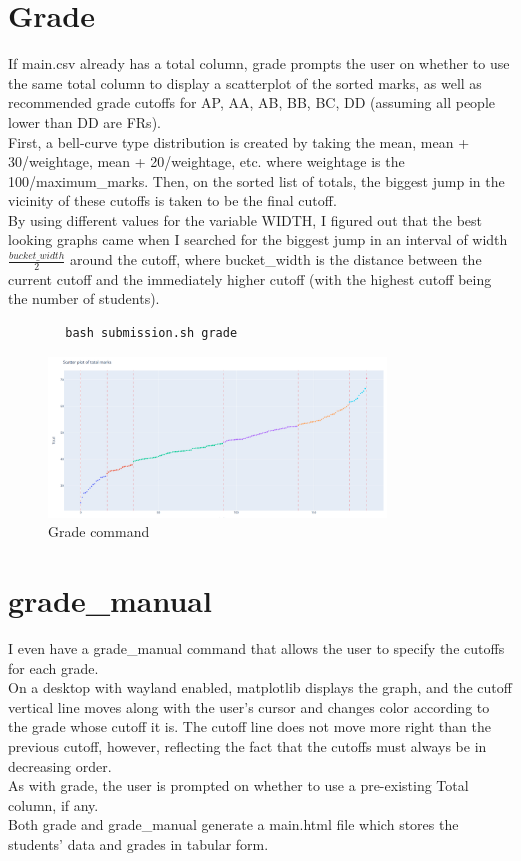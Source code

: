 \documentclass{article}
\begin{document}
    \section{Grade}
    If main.csv already has a total column, grade prompts the user on whether to use the same total column to display a scatterplot of the sorted marks, as well as recommended grade cutoffs for AP, AA, AB, BB, BC, DD (assuming all people lower than DD are FRs).\\
    First, a bell-curve type distribution is created by taking the mean, mean + 30/weightage, mean + 20/weightage, etc. where weightage is the 100/maximum\_marks. Then, on the sorted list of totals, the biggest jump in the vicinity of these cutoffs is taken to be the final cutoff.\\
    By using different values for the variable WIDTH, I figured out that the best looking graphs came when I searched for the biggest jump in an interval of width $\frac{bucket\_width}{2}$ around the cutoff, where bucket\_width is the distance between the current cutoff and the immediately higher cutoff (with the highest cutoff being the number of students).\\
    \begin{lstlisting}
        bash submission.sh grade
    \end{lstlisting}
    \begin{figure}[htbp]
        \centering
        \includegraphics[width=0.8\textwidth]{Grade.png}
        \caption{Grade command}
        \label{fig:grade}
    \end{figure}

    \section{grade\_manual}
    I even have a grade\_manual command that allows the user to specify the cutoffs for each grade.\\
    On a desktop with wayland enabled, matplotlib displays the graph, and the cutoff vertical line moves along with the user's cursor and changes color according to the grade whose cutoff it is. The cutoff line does not move more right than the previous cutoff, however, reflecting the fact that the cutoffs must always be in decreasing order.\\
    As with grade, the user is prompted on whether to use a pre-existing Total column, if any.\\
    Both grade and grade\_manual generate a main.html file which stores the students' data and grades in tabular form.\\
\end{document}
